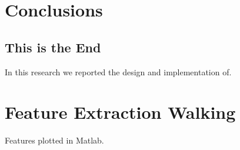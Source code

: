 \documentclass[12pt,a4paper,oneside]{book}
\begin{document}

\chapter{Conclusions}
\label{ch:Conclusions}

\section{This is the End}
\label{sec:This_is_the_end}
%
In this research we reported the design and implementation of.


\appendix
\chapter{Feature Extraction Walking}
%
Features plotted in Matlab.






\backmatter
\end{document}
